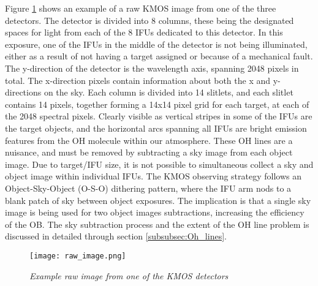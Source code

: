 \documentclass{literature}
\begin{document}
Figure \ref{fig:raw_image} shows an example of a raw KMOS image from one of the three detectors. The detector is divided into 8 columns, these being the designated spaces for light from each of the 8 IFUs dedicated to this detector. In this exposure, one of the IFUs in the middle of the detector is not being illuminated, either as a result of not having a target assigned or because of a mechanical fault. The y-direction of the detector is the wavelength axis, spanning 2048 pixels in total. The x-direction pixels contain information about both the x and y-directions on the sky. Each column is divided into 14 slitlets, and each slitlet contains 14 pixels, together forming a 14x14 pixel grid for each target, at each of the 2048 spectral pixels. Clearly visible as vertical stripes in some of the IFUs are the target objects, and the horizontal arcs spanning all IFUs are bright emission features from the OH molecule within our atmosphere. These OH lines are a nuisance, and must be removed by subtracting a sky image from each object image. Due to target/IFU size, it is not possible to simultaneous collect a sky and object image within individual IFUs. The KMOS observing strategy follows an Object-Sky-Object (O-S-O) dithering pattern, where the IFU arm nods to a blank patch of sky between object exposures. The implication is that a single sky image is being used for two object images subtractions, increasing the efficiency of the OB. The sky subtraction process and the extent of the OH line problem is discussed in detailed through section \ref{subsubsec:Oh_lines}.

\begin{figure}[!htp]
\centering
\texttt{[image: raw\_image.png]}
\caption{\footnotesize{\emph{Example raw image from one of the KMOS detectors}}}
\label{fig:raw_image}
\end{figure}  	
  
\end{document}
